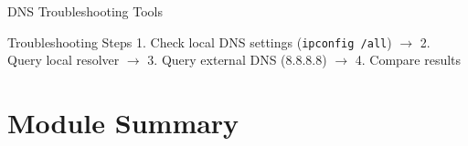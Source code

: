 \documentclass[aspectratio=169]{beamer}  %
\begin{document}
\begin{frame}{DNS Troubleshooting Tools}
    \vspace{0.3em}
    \begin{exampleblock}{Troubleshooting Steps}
        \small
        1. Check local DNS settings (\texttt{ipconfig /all}) $\rightarrow$ 
        2. Query local resolver $\rightarrow$ 
        3. Query external DNS (8.8.8.8) $\rightarrow$ 
        4. Compare results
    \end{exampleblock}
\end{frame}

\section*{Module Summary}
\end{document}
